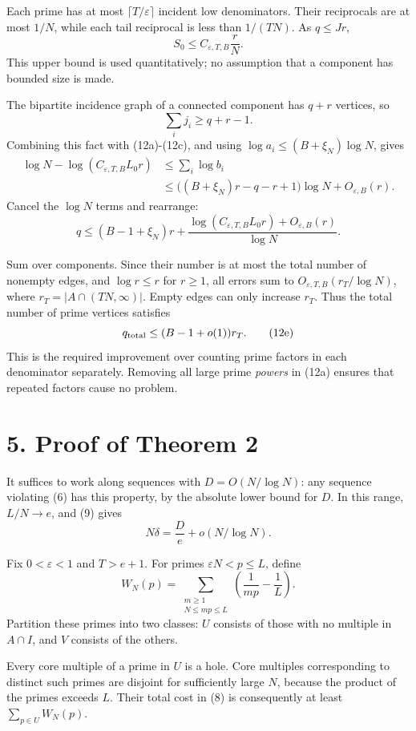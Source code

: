 \documentclass[11pt]{article}
\begin{document}
Each prime has at most \(\lceil T/\varepsilon\rceil\) incident low denominators. Their reciprocals are at most \(1/N\), while each tail reciprocal is less than \(1/(TN)\). As \(q\le Jr\),
\[
S_0\le C_{\varepsilon,T,B}\frac rN. \tag{12c}
\]
This upper bound is used quantitatively; no assumption that a component has bounded size is made.

The bipartite incidence graph of a connected component has \(q+r\) vertices, so
\[
\sum_i j_i\ge q+r-1.
\]
Combining this fact with (12a)-(12c), and using \(\log a_i\le(B+\xi_N)\log N\), gives
\[
\begin{aligned}
\log N-\log(C_{\varepsilon,T,B}L_0r)
&\le\sum_i\log b_i\\
&\le\bigl((B+\xi_N)r-q-r+1\bigr)\log N
     +O_{\varepsilon,B}(r).
\end{aligned}
\]
Cancel the \(\log N\) terms and rearrange:
\[
q\le(B-1+\xi_N)r
  +\frac{\log(C_{\varepsilon,T,B}L_0r)+O_{\varepsilon,B}(r)}{\log N}.
\tag{12d}
\]

Sum over components. Since their number is at most the total number of nonempty edges, and \(\log r\le r\) for \(r\ge1\), all errors sum to \(O_{\varepsilon,T,B}(r_T/\log N)\), where \(r_T=|A\cap(TN,\infty)|\). Empty edges can only increase \(r_T\). Thus the total number of prime vertices satisfies
\[
q_{\rm total}\le(B-1+o(1))r_T. \tag{12e}
\]
This is the required improvement over counting prime factors in each denominator separately. Removing all large prime \emph{powers} in (12a) ensures that repeated factors cause no problem.

\section*{5. Proof of Theorem 2}

It suffices to work along sequences with \(D=O(N/\log N)\): any sequence violating (6) has this property, by the absolute lower bound for \(D\). In this range, \(L/N\to e\), and (9) gives
\[
N\delta=\frac D e+o(N/\log N). \tag{12}
\]

Fix \(0<\varepsilon<1\) and \(T>e+1\). For primes \(\varepsilon N<p\le L\), define
\[
W_N(p)=\sum_{\substack{m\ge1\\N\le mp\le L}}
                  \left(\frac1{mp}-\frac1L\right).
\]
Partition these primes into two classes: \(U\) consists of those with no multiple in \(A\cap I\), and \(V\) consists of the others.

Every core multiple of a prime in \(U\) is a hole. Core multiples corresponding to distinct such primes are disjoint for sufficiently large \(N\), because the product of the primes exceeds \(L\). Their total cost in (8) is consequently at least \(\sum_{p\in U}W_N(p)\).
\end{document}
